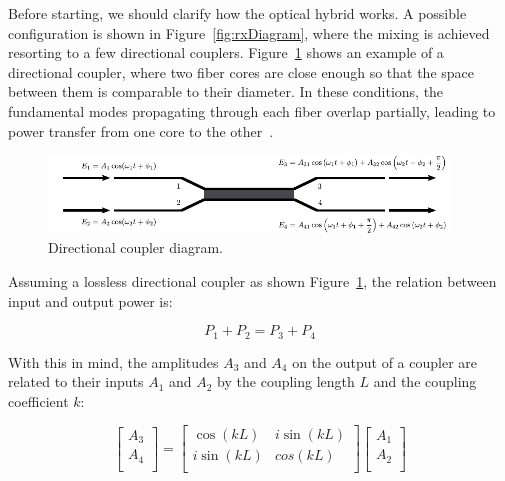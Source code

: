 	Before starting, we should clarify how the optical hybrid works. A possible
	configuration is shown in Figure~\ref{fig:rxDiagram}, where the mixing is
	achieved resorting to a few directional couplers. Figure~\ref{fig:coupler}
	shows an example of a directional coupler, where two fiber cores are close enough so that the space
	between them is comparable to their diameter. In these conditions, the
	fundamental modes propagating through each fiber overlap partially, leading to
	power transfer from one core to the other~\cite{agrawal04}.

	\begin{figure}[H]
		\centering
		\centering
		\includegraphics[width=0.95\textwidth]{./sdf/m_qam_system/figures/coupler.pdf}
		\caption{\label{fig:coupler} Directional coupler diagram.}
	\end{figure}

%
	Assuming a lossless directional coupler as shown Figure~\ref{fig:coupler},
	the relation between input and output power is:

	\begin{equation}\label{eq:couplerPower}
		P_1 + P_2 = P_3 + P_4
	\end{equation}


	With this in mind, the amplitudes $A_3$ and $A_4$
	on the output of a coupler are related to their inputs $A_1$ and $A_2$ by the
	coupling length $L$ and the coupling coefficient $k$:

	\begin{equation}\label{eq:couplerInOut}
	\begin{bmatrix}
		A_3 \\
		A_4 \\
	\end{bmatrix}
	=
	\begin{bmatrix}
		\cos(kL) & i\sin(kL) \\
		i\sin(kL) & cos(kL) \\
	\end{bmatrix}
	\begin{bmatrix}
		A_1 \\
		A_2 \\
	\end{bmatrix}
\end{equation}
%

